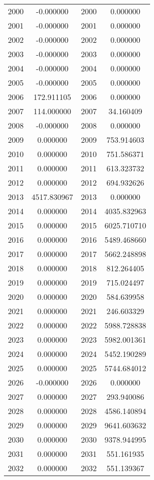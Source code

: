 \documentclass[12pt]{article}
\begin{document}
\begin{longtable}{@{}cccc@{}}
2000 & -0.000000 & 2000 & 0.000000 \\
2001 & -0.000000 & 2001 & 0.000000 \\
2002 & -0.000000 & 2002 & 0.000000 \\
2003 & -0.000000 & 2003 & 0.000000 \\
2004 & -0.000000 & 2004 & 0.000000 \\
2005 & -0.000000 & 2005 & 0.000000 \\
2006 & 172.911105 & 2006 & 0.000000 \\
2007 & 114.000000 & 2007 & 34.160409 \\
2008 & -0.000000 & 2008 & 0.000000 \\
2009 & 0.000000 & 2009 & 753.914603 \\
2010 & 0.000000 & 2010 & 751.586371 \\
2011 & 0.000000 & 2011 & 613.323732 \\
2012 & 0.000000 & 2012 & 694.932626 \\
2013 & 4517.830967 & 2013 & 0.000000 \\
2014 & 0.000000 & 2014 & 4035.832963 \\
2015 & 0.000000 & 2015 & 6025.710710 \\
2016 & 0.000000 & 2016 & 5489.468660 \\
2017 & 0.000000 & 2017 & 5662.248898 \\
2018 & 0.000000 & 2018 & 812.264405 \\
2019 & 0.000000 & 2019 & 715.024497 \\
2020 & 0.000000 & 2020 & 584.639958 \\
2021 & 0.000000 & 2021 & 246.603329 \\
2022 & 0.000000 & 2022 & 5988.728838 \\
2023 & 0.000000 & 2023 & 5982.001361 \\
2024 & 0.000000 & 2024 & 5452.190289 \\
2025 & 0.000000 & 2025 & 5744.684012 \\
2026 & -0.000000 & 2026 & 0.000000 \\
2027 & 0.000000 & 2027 & 293.940086 \\
2028 & 0.000000 & 2028 & 4586.140894 \\
2029 & 0.000000 & 2029 & 9641.603632 \\
2030 & 0.000000 & 2030 & 9378.944995 \\
2031 & 0.000000 & 2031 & 551.161935 \\
2032 & 0.000000 & 2032 & 551.139367 \\

\end{longtable}
\end{document}
